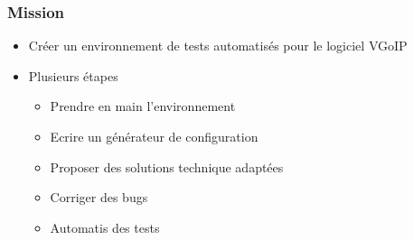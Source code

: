 \begin{frame}
    \frametitle{Mission}
    \begin{itemize}
        \item Créer un environnement de tests automatisés pour le logiciel VGoIP
        \item Plusieurs étapes
            \begin{itemize}
                \item Prendre en main l'environnement
                \item Ecrire un générateur de configuration
                \item Proposer des solutions technique adaptées
                \item Corriger des bugs
                \item Automatis des tests
            \end{itemize}
    \end{itemize}
\end{frame}